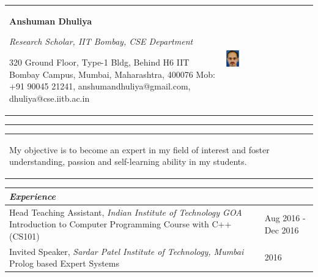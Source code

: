 \documentclass[a4paper,12pt]{article}
\newcommand{\Heading}[1]{\textbf{\itshape\normalsize #1}}
\begin{document}
\begin{flushleft}



    \begin{tabular*}{\textwidth}{m{} m{} }
        {\LARGE{}\rule[3ex]{0ex}{0ex}\textbf{Anshuman Dhuliya}}\newline%
        {\rule[3ex]{0ex}{0ex}\large{}\itshape{}Research Scholar, IIT Bombay, CSE Department} \newline%
        \rule[3ex]{0ex}{0ex}{320 Ground Floor, Type-1 Bldg, Behind H6\newline%
IIT Bombay Campus, Mumbai, Maharashtra, 400076\newline%
        Mob: +91 90045 21241, anshumandhuliya@gmail.com, dhuliya@cse.iitb.ac.in}

&  \includegraphics[natwidth=273,natheight=360,width=0.15\textwidth]{images/anshuman1.eps} \\
\end{tabular*}
\rule[1pt]{\textwidth}{2pt}
\begin{tabular*}{\textwidth}{m{} m{} }
{\itshape{}\rule[3ex]{0ex}{0ex}My objective is to become an expert in my field of interest and foster understanding, passion and\newline%
    self-learning ability in my students.} & \\
\end{tabular*}

    \vspace{3mm}
\begin{tabular}{ m{}| R{0.25\textwidth}}
\multicolumn{2}{l}{\Heading{Experience}} \\
    \hline
    \hline
    \rule[3ex]{0ex}{0ex}Head Teaching Assistant, \textit{Indian Institute of Technology GOA} \newline{}Introduction to Computer Programming Course with C++ (CS101) & Aug 2016 - Dec 2016\\ \hline

    \rule[3ex]{0ex}{0ex}Invited Speaker, \textit{Sardar Patel Institute of Technology, Mumbai} \newline{}Prolog based Expert Systems & 2016\\ \hline


\end{tabular}
\end{flushleft}
\end{document}
